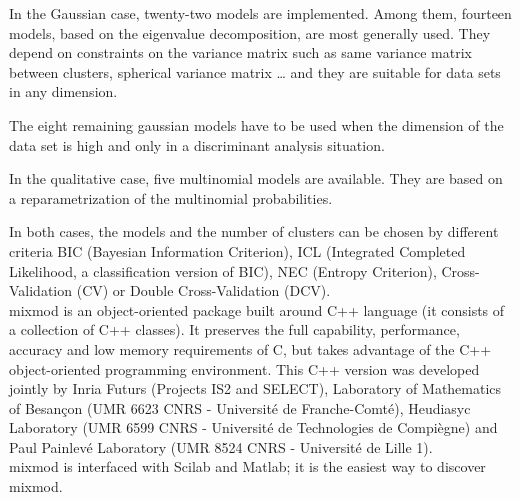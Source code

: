 
In the Gaussian case, twenty-two models are implemented. Among them, fourteen models,
based on the eigenvalue decomposition, are most generally used. They depend on constraints
on the variance matrix such as same variance matrix between clusters, spherical variance matrix
\dots{} and they are suitable for data sets in any dimension.

The eight remaining gaussian models have to be used when the dimension of the data set
is high and only in a discriminant analysis situation.

In the qualitative case, five multinomial models are available. They are based on a reparametrization of
the multinomial probabilities.


In both cases, the
models and the number of clusters can be chosen by different criteria BIC
(Bayesian Information Criterion), ICL (Integrated Completed
Likelihood, a classification version of BIC), NEC (Entropy Criterion), Cross-Validation (CV) or Double Cross-Validation (DCV).\\




{\sc mixmod} is an object-oriented package built around C++ language
(it consists of a collection of C++ classes). It preserves the full
capability, performance, accuracy and low memory requirements of C,
but takes advantage of the C++ object-oriented programming
environment. This C++ version was developed jointly by Inria
Futurs (Projects IS2 and SELECT), Laboratory of Mathematics of Besan\c{c}on (UMR 6623 CNRS - Universit\'e de Franche-Comt\'e), Heudiasyc Laboratory (UMR 6599 CNRS - Universit\'e de Technologies de Compi\`egne) and Paul Painlev\'e Laboratory (UMR 8524 CNRS - Universit\'e de Lille 1).\\
{\sc mixmod} is interfaced with Scilab and Matlab; it is the easiest way to discover {\sc mixmod}.

